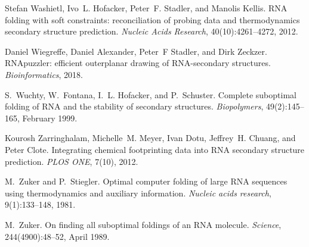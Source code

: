 \begin{DoxyDescription}
\item[\label{citelist_CITEREF_washietl:2012}%
\Hypertarget{citelist_CITEREF_washietl:2012}%
\mbox{[}22\mbox{]}]Stefan Washietl, Ivo~L. Hofacker, Peter~F. Stadler, and Manolis Kellis. R\+NA folding with soft constraints\+: reconciliation of probing data and thermodynamics secondary structure prediction. {\itshape Nucleic Acids Research}, 40(10)\+:4261--4272, 2012.


\item[\label{citelist_CITEREF_wiegreffe:2018}%
\Hypertarget{citelist_CITEREF_wiegreffe:2018}%
\mbox{[}23\mbox{]}]Daniel Wiegreffe, Daniel Alexander, Peter~F Stadler, and Dirk Zeckzer. R\+N\+Apuzzler\+: efficient outerplanar drawing of R\+N\+A-\/secondary structures. {\itshape Bioinformatics}, 2018.


\item[\label{citelist_CITEREF_wuchty:1999}%
\Hypertarget{citelist_CITEREF_wuchty:1999}%
\mbox{[}24\mbox{]}]S.~Wuchty, W.~Fontana, I.~L. Hofacker, and P.~Schuster. Complete suboptimal folding of R\+NA and the stability of secondary structures. {\itshape Biopolymers}, 49(2)\+:145--165, February 1999.


\item[\label{citelist_CITEREF_zarringhalam:2012}%
\Hypertarget{citelist_CITEREF_zarringhalam:2012}%
\mbox{[}25\mbox{]}]Kourosh Zarringhalam, Michelle~M. Meyer, Ivan Dotu, Jeffrey~H. Chuang, and Peter Clote. Integrating chemical footprinting data into R\+NA secondary structure prediction. {\itshape P\+L\+OS O\+NE}, 7(10), 2012.


\item[\label{citelist_CITEREF_zuker:1981}%
\Hypertarget{citelist_CITEREF_zuker:1981}%
\mbox{[}26\mbox{]}]M.~Zuker and P.~Stiegler. Optimal computer folding of large R\+NA sequences using thermodynamics and auxiliary information. {\itshape Nucleic acids research}, 9(1)\+:133--148, 1981.


\item[\label{citelist_CITEREF_zuker:1989}%
\Hypertarget{citelist_CITEREF_zuker:1989}%
\mbox{[}27\mbox{]}]M.~Zuker. On finding all suboptimal foldings of an R\+NA molecule. {\itshape Science}, 244(4900)\+:48--52, April 1989.


\end{DoxyDescription}